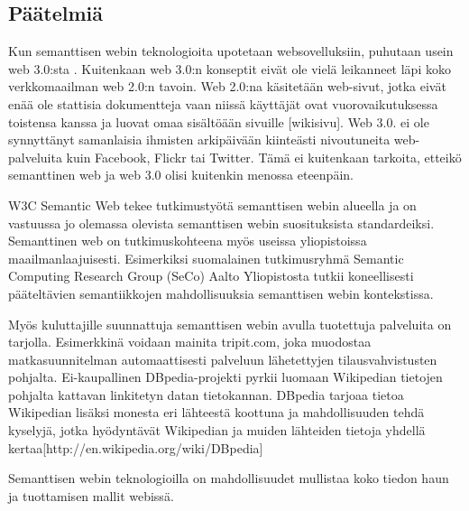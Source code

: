 \documentclass[finnish]{tktltiki2}
\theoremstyle{definition}
\theoremstyle{remark}
\begin{document}
\subsection{Päätelmiä}

Kun semanttisen webin teknologioita upotetaan websovelluksiin, puhutaan usein web 3.0:sta \cite{WEB3}. Kuitenkaan web 3.0:n konseptit eivät ole vielä leikanneet läpi koko verkkomaailman web 2.0:n tavoin. Web 2.0:na käsitetään web-sivut, jotka eivät enää ole stattisia dokumentteja vaan niissä käyttäjät ovat vuorovaikutuksessa toistensa kanssa ja luovat omaa sisältöään sivuille [wikisivu]. Web 3.0. ei ole synnyttänyt samanlaisia ihmisten arkipäivään kiinteästi nivoutuneita  web-palveluita kuin Facebook, Flickr tai Twitter. Tämä ei kuitenkaan tarkoita, etteikö semanttinen web ja web 3.0 olisi kuitenkin menossa eteenpäin. 

W3C Semantic Web tekee tutkimustyötä semanttisen webin alueella ja on vastuussa jo olemassa olevista semanttisen webin suosituksista standardeiksi. Semanttinen web on tutkimuskohteena myös useissa yliopistoissa maailmanlaajuisesti. Esimerkiksi suomalainen tutkimusryhmä Semantic Computing Research Group (SeCo) Aalto Yliopistosta tutkii koneellisesti pääteltävien semantiikkojen mahdollisuuksia semanttisen webin kontekstissa.  

Myös kuluttajille suunnattuja semanttisen webin avulla tuotettuja palveluita on tarjolla. Esimerkkinä voidaan mainita tripit.com, joka muodostaa matkasuunnitelman automaattisesti palveluun lähetettyjen tilausvahvistusten pohjalta. Ei-kaupallinen DBpedia-projekti pyrkii luomaan Wikipedian tietojen pohjalta kattavan linkitetyn datan tietokannan. DBpedia tarjoaa tietoa Wikipedian lisäksi monesta eri lähteestä koottuna ja mahdollisuuden tehdä kyselyjä, jotka hyödyntävät Wikipedian ja muiden lähteiden tietoja yhdellä kertaa[http://en.wikipedia.org/wiki/DBpedia] 

Semanttisen webin teknologioilla on mahdollisuudet mullistaa koko tiedon haun ja tuottamisen mallit webissä.  


%
%
% 
%
\newpage



\end{document}

